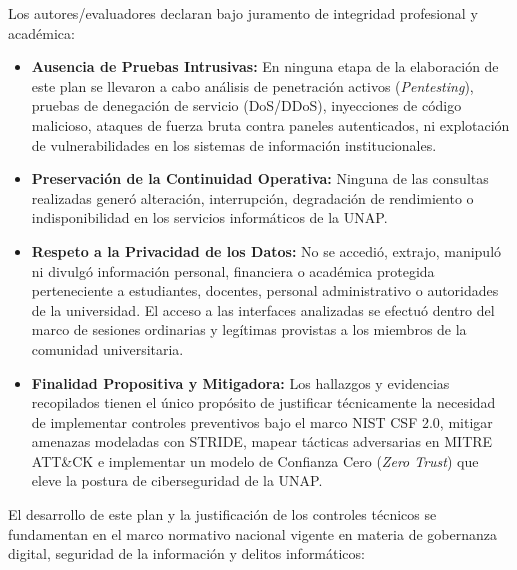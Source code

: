 Los autores/evaluadores declaran bajo juramento de integridad profesional y académica:

\begin{itemize}[itemsep=3pt,topsep=3pt,parsep=0pt]
    \item \textbf{Ausencia de Pruebas Intrusivas:} En ninguna etapa de la elaboración de este plan se llevaron a cabo análisis de penetración activos (\textit{Pentesting}), pruebas de denegación de servicio (DoS/DDoS), inyecciones de código malicioso, ataques de fuerza bruta contra paneles autenticados, ni explotación de vulnerabilidades en los sistemas de información institucionales.
    
    \item \textbf{Preservación de la Continuidad Operativa:} Ninguna de las consultas realizadas generó alteración, interrupción, degradación de rendimiento o indisponibilidad en los servicios informáticos de la UNAP.
    
    \item \textbf{Respeto a la Privacidad de los Datos:} No se accedió, extrajo, manipuló ni divulgó información personal, financiera o académica protegida perteneciente a estudiantes, docentes, personal administrativo o autoridades de la universidad. El acceso a las interfaces analizadas se efectuó dentro del marco de sesiones ordinarias y legítimas provistas a los miembros de la comunidad universitaria.
    
    \item \textbf{Finalidad Propositiva y Mitigadora:} Los hallazgos y evidencias recopilados tienen el único propósito de justificar técnicamente la necesidad de implementar controles preventivos bajo el marco NIST CSF 2.0, mitigar amenazas modeladas con STRIDE, mapear tácticas adversarias en MITRE ATT\&CK e implementar un modelo de Confianza Cero (\textit{Zero Trust}) que eleve la postura de ciberseguridad de la UNAP.
\end{itemize}

\clearpage


El desarrollo de este plan y la justificación de los controles técnicos se fundamentan en el marco normativo nacional vigente en materia de gobernanza digital, seguridad de la información y delitos informáticos:

